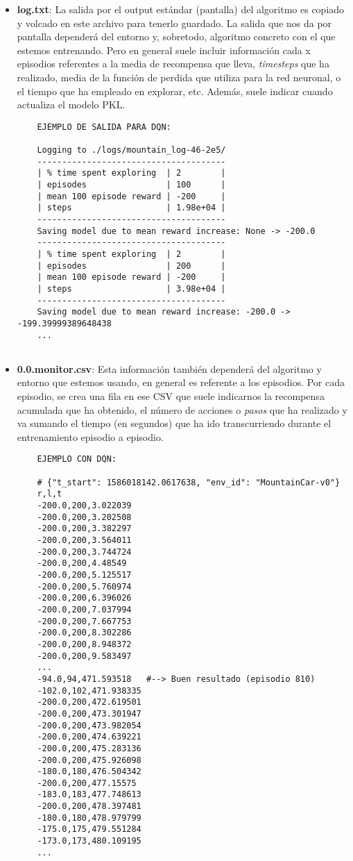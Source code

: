 \documentclass[11pt,fleqn]{book} %
\begin{document}
\begin{itemize}
	\item \textbf{log.txt}: La salida por el output estándar (pantalla) del algoritmo es copiado y volcado en este archivo para tenerlo guardado. La salida que nos da por pantalla dependerá del entorno y, sobretodo, algoritmo concreto con el que estemos entrenando. Pero en general suele incluir información cada x episodios referentes a la media de recompensa que lleva, \textit{timesteps} que ha realizado, media de la función de perdida que utiliza para la red neuronal, o el tiempo que ha empleado en explorar, etc. Además, suele indicar cuando actualiza el modelo PKL.\\
	
	\begin{verbatim}
	EJEMPLO DE SALIDA PARA DQN:
	
	Logging to ./logs/mountain_log-46-2e5/
	--------------------------------------
	| % time spent exploring  | 2        |
	| episodes                | 100      |
	| mean 100 episode reward | -200     |
	| steps                   | 1.98e+04 |
	--------------------------------------
	Saving model due to mean reward increase: None -> -200.0
	--------------------------------------
	| % time spent exploring  | 2        |
	| episodes                | 200      |
	| mean 100 episode reward | -200     |
	| steps                   | 3.98e+04 |
	--------------------------------------
	Saving model due to mean reward increase: -200.0 -> -199.39999389648438
	...
	
	\end{verbatim}
	
	\item \textbf{0.0.monitor.csv}: Esta información también dependerá del algoritmo y entorno que estemos usando, en general es referente a los episodios. Por cada episodio, se crea una fila en ese CSV que suele indicarnos la recompensa acumulada que ha obtenido, el número de acciones o \textit{pasos} que ha realizado y va sumando el tiempo (en segundos) que ha ido transcurriendo durante el entrenamiento episodio a episodio.\\
	
	\begin{verbatim}
	EJEMPLO CON DQN:
	
	# {"t_start": 1586018142.0617638, "env_id": "MountainCar-v0"} 
	r,l,t
	-200.0,200,3.022039
	-200.0,200,3.202508
	-200.0,200,3.382297
	-200.0,200,3.564011
	-200.0,200,3.744724
	-200.0,200,4.48549
	-200.0,200,5.125517
	-200.0,200,5.760974
	-200.0,200,6.396026
	-200.0,200,7.037994
	-200.0,200,7.667753
	-200.0,200,8.302286
	-200.0,200,8.948372
	-200.0,200,9.583497
	...
	-94.0,94,471.593518   #--> Buen resultado (episodio 810)
	-102.0,102,471.938335
	-200.0,200,472.619501
	-200.0,200,473.301947
	-200.0,200,473.982054
	-200.0,200,474.639221
	-200.0,200,475.283136
	-200.0,200,475.926098
	-180.0,180,476.504342
	-200.0,200,477.15575
	-183.0,183,477.748613
	-200.0,200,478.397481
	-180.0,180,478.979799
	-175.0,175,479.551284
	-173.0,173,480.109195
	...
	\end{verbatim}
	

\end{itemize}
\end{document}
